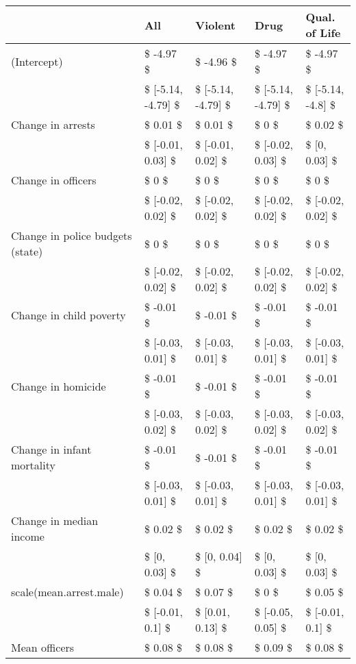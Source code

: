 \begin{table}[ht]
\centering
\begin{tabular}{lllll}
  \hline
  & All & Violent & Drug & Qual. of Life \\ 
  \hline
(Intercept) & \$ -4.97 \$ & \$ -4.96 \$ & \$ -4.97 \$ & \$ -4.97 \$ \\ 
   & \$ [-5.14, -4.79] \$ & \$ [-5.14, -4.79] \$ & \$ [-5.14, -4.79] \$ & \$ [-5.14, -4.8] \$ \\ 
  Change in arrests & \$ 0.01 \$ & \$ 0.01 \$ & \$ 0 \$ & \$ 0.02 \$ \\ 
   & \$ [-0.01, 0.03] \$ & \$ [-0.01, 0.02] \$ & \$ [-0.02, 0.03] \$ & \$ [0, 0.03] \$ \\ 
  Change in officers & \$ 0 \$ & \$ 0 \$ & \$ 0 \$ & \$ 0 \$ \\ 
   & \$ [-0.02, 0.02] \$ & \$ [-0.02, 0.02] \$ & \$ [-0.02, 0.02] \$ & \$ [-0.02, 0.02] \$ \\ 
  Change in police budgets (state) & \$ 0 \$ & \$ 0 \$ & \$ 0 \$ & \$ 0 \$ \\ 
   & \$ [-0.02, 0.02] \$ & \$ [-0.02, 0.02] \$ & \$ [-0.02, 0.02] \$ & \$ [-0.02, 0.02] \$ \\ 
  Change in child poverty & \$ -0.01 \$ & \$ -0.01 \$ & \$ -0.01 \$ & \$ -0.01 \$ \\ 
   & \$ [-0.03, 0.01] \$ & \$ [-0.03, 0.01] \$ & \$ [-0.03, 0.01] \$ & \$ [-0.03, 0.01] \$ \\ 
  Change in homicide & \$ -0.01 \$ & \$ -0.01 \$ & \$ -0.01 \$ & \$ -0.01 \$ \\ 
   & \$ [-0.03, 0.02] \$ & \$ [-0.03, 0.02] \$ & \$ [-0.03, 0.02] \$ & \$ [-0.03, 0.02] \$ \\ 
  Change in infant mortality & \$ -0.01 \$ & \$ -0.01 \$ & \$ -0.01 \$ & \$ -0.01 \$ \\ 
   & \$ [-0.03, 0.01] \$ & \$ [-0.03, 0.01] \$ & \$ [-0.03, 0.01] \$ & \$ [-0.03, 0.01] \$ \\ 
  Change in median income & \$ 0.02 \$ & \$ 0.02 \$ & \$ 0.02 \$ & \$ 0.02 \$ \\ 
   & \$ [0, 0.03] \$ & \$ [0, 0.04] \$ & \$ [0, 0.03] \$ & \$ [0, 0.03] \$ \\ 
  scale(mean.arrest.male) & \$ 0.04 \$ & \$ 0.07 \$ & \$ 0 \$ & \$ 0.05 \$ \\ 
   & \$ [-0.01, 0.1] \$ & \$ [0.01, 0.13] \$ & \$ [-0.05, 0.05] \$ & \$ [-0.01, 0.1] \$ \\ 
  Mean officers & \$ 0.08 \$ & \$ 0.08 \$ & \$ 0.09 \$ & \$ 0.08 \$ \\ 

\end{tabular}
\end{table}
